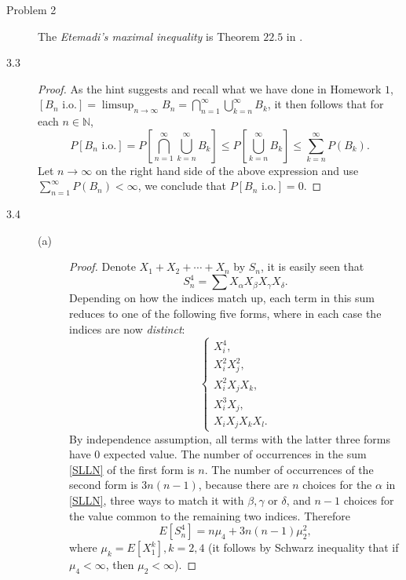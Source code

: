 \documentclass{article}
\newcommand{\nn}{\mathbb{N}}
\theoremstyle{definition}
\theoremstyle{plain}
\theoremstyle{remark}
\begin{document}
\begin{description}
\item[Problem 2]
The \emph{Etemadi's maximal inequality} is Theorem $22.5$ in \cite{billingsley95}.

\item[3.3]
\begin{proof}
As the hint suggests and recall what we have done in Homework $1$, $[B_n \text{ i.o.}] = \limsup_{n \to \infty} B_n = \bigcap_{n = 1}^\infty\bigcup_{k = n}^\infty B_k$, it then follows that for each $n \in \nn$,
$$P[B_n \text{ i.o.}] = P\left[\bigcap_{n = 1}^\infty\bigcup_{k = n}^\infty B_k\right] \leq P\left[\bigcup_{k = n}^\infty B_k\right] \leq \sum_{k = n}^\infty P(B_k). $$
Let $n \to \infty$ on the right hand side of the above expression and use $\sum_{n = 1}^\infty P(B_n) < \infty$, we conclude that $P[B_n \text{ i.o.}] = 0$.
\end{proof}

\item[3.4]
\begin{description}
\item[(a)]
\begin{proof}
Denote $X_1 + X_2 + \cdots + X_n$ by $S_n$, it is easily seen that 
\begin{equation}\label{SLLN}
S_n^4 = \sum X_\alpha X_\beta X_\gamma X_\delta.
\end{equation}
Depending on how the indices match up, each term in this sum reduces to one of the following five forms, where in
each case the indices are now \emph{distinct}:
\begin{equation*}
\begin{cases}
X_i^4, \\
X_i^2 X_j^2, \\
X_i^2 X_j X_k, \\
X_i^3 X_j, \\
X_i X_j X_k X_l.
\end{cases}
\end{equation*}
By independence assumption, all terms with the latter three forms have $0$ expected value. The number of occurrences in the sum \eqref{SLLN} of the first form is $n$. The number of occurrences of the second form is $3n(n - 1)$, because there are $n$ choices for the $\alpha$ in \eqref{SLLN}, three ways to match it with $\beta, \gamma$ or $\delta$, and $n - 1$ choices for the value common to the remaining two indices. Therefore
$$E[S_n^4] = n\mu_4 + 3n(n - 1)\mu_2^2,$$
where $\mu_k = E[X_1^k], k = 2, 4$ (it follows by Schwarz inequality that if $\mu_4 < \infty$, then $\mu_2 < \infty$).  
\end{proof}


\end{description}
\end{description}
\end{document}
